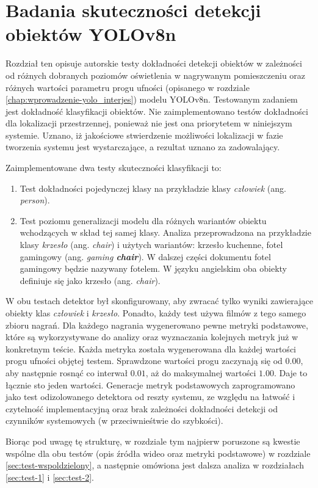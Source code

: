 \chapter{Badania skuteczności detekcji obiektów YOLOv8n}
\label{chap:badania-skutecznosci}
Rozdział ten opisuje autorskie testy dokładności detekcji obiektów w zależności od różnych dobranych poziomów oświetlenia w nagrywanym pomieszczeniu oraz różnych wartości parametru progu ufności (opisanego w rozdziale \ref{chap:wprowadzenie-yolo_interjes}) modelu YOLOv8n. Testowanym zadaniem jest dokładność klasyfikacji obiektów. Nie zaimplementowano testów dokładności dla lokalizacji przestrzennej, ponieważ nie jest ona priorytetem w niniejszym systemie. Uznano, iż jakościowe stwierdzenie możliwości lokalizacji w fazie tworzenia systemu jest wystarczające, a rezultat uznano za zadowalający. 

Zaimplementowane dwa testy skuteczności klasyfikacji to:
\begin{enumerate}
    \item Test dokładności pojedynczej klasy na przykładzie klasy \emph{człowiek} (ang. \emph{person}). 
    \item  Test poziomu generalizacji modelu dla różnych wariantów obiektu wchodzących w skład tej samej klasy. Analiza przeprowadzona na przykładzie klasy \emph{krzesło} (ang. \emph{chair}) i użytych wariantów: krzesło kuchenne, fotel gamingowy (ang. \emph{gaming \textbf{chair}}). W dalszej części dokumentu fotel gamingowy będzie nazywany fotelem. W języku angielskim oba obiekty definiuje się jako krzesło (ang. \emph{chair}).  
\end{enumerate}
W obu testach detektor był skonfigurowany, aby zwracać tylko wyniki zawierające obiekty klas \emph{człowiek} i \emph{krzesło}. Ponadto, każdy test używa filmów z tego samego zbioru nagrań. Dla każdego nagrania wygenerowano pewne metryki podstawowe, które są wykorzystywane do analizy oraz wyznaczania kolejnych metryk już w konkretnym teście. Każda metryka została wygenerowana dla każdej wartości progu ufności objętej testem. Sprawdzone wartości progu zaczynają się od $0.00$, aby następnie rosnąć co interwał $0.01$, aż do maksymalnej wartości $1.00$. Daje to łącznie sto jeden wartości. Generacje metryk podstawowych zaprogramowano jako test odizolowanego detektora od reszty systemu, ze względu na łatwość i czytelność implementacyjną oraz brak zależności dokładności detekcji od czynników systemowych (w przeciwnieśtwie do szybkości).  

Biorąc pod uwagę tę strukturę, w rozdziale tym najpierw poruszone są kwestie wspólne dla obu testów (opis źródła wideo oraz metryki podstawowe) w rozdziale \ref{sec:test-wspoldzielony}, a następnie omówiona jest dalsza analiza w rozdziałach \ref{sec:test-1} i \ref{sec:test-2}.
 
